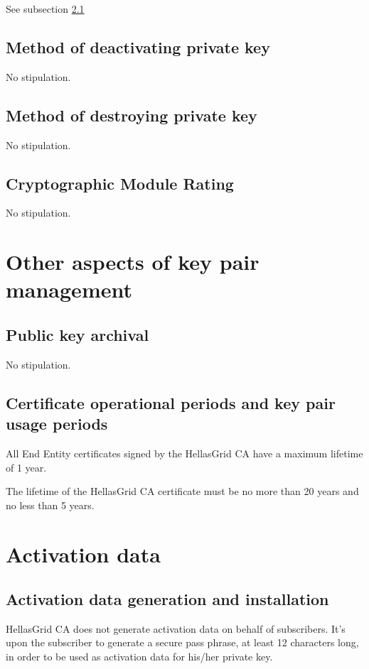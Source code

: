 See subsection \ref{sub:ActivationDataGenerationAndInstallation}

\subsection{Method of deactivating private key}

No stipulation.

\subsection{Method of destroying private key}

No stipulation.

\subsection{Cryptographic Module Rating}

No stipulation.

\section{Other aspects of key pair management}


\subsection{Public key archival}

No stipulation.

\subsection{Certificate operational periods and key pair usage periods}

All End Entity certificates signed by the HellasGrid CA have a maximum lifetime of 1 year.

The lifetime of the HellasGrid CA certificate must be no more than 20 years and no less than 5 years.

\section{Activation data}
\subsection{Activation data generation and installation}
\label{sub:ActivationDataGenerationAndInstallation}

HellasGrid CA does not generate activation data on behalf of subscribers. It's upon the subscriber to generate a secure pass phrase, at least 12 characters long, in order to be used as activation data for his/her private key.

